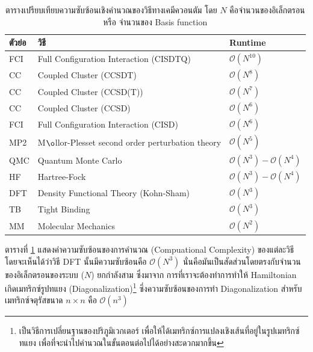 \begin{table}[htbp]
    \centering
    \caption{ตารางเปรียบเทียบความซับซ้อนเชิงคำนวณของวิธีทางเคมีควอนตัม\autocite{rupp2015} โดย $N$ คือจำนวนของอิเล็กตรอนหรือ%
    จำนวนของ Basis function}
    \label{tab:qm_complx}
    \small
    \begin{tabular}{lll}\toprule
    \textbf{ตัวย่อ} &\textbf{วิธี} &\textbf{Runtime} \\\midrule
    FCI &Full Configuration Interaction (CISDTQ) &$\mathcal{O}(N^{10})$ \\
    CC &Coupled Cluster (CCSDT) &$\mathcal{O}(N^{8})$ \\
    CC &Coupled Cluster (CCSD(T)) &$\mathcal{O}(N^{7})$ \\
    CC &Coupled Cluster (CCSD) &$\mathcal{O}(N^{6})$ \\
    FCI &Full Configuration Interaction (CISD) &$\mathcal{O}(N^{6})$ \\
    MP2 &M$\o$llor-Plesset second order perturbation theory &$\mathcal{O}(N^{5})$ \\
    QMC &Quantum Monte Carlo &$\mathcal{O}(N^{3}) - \mathcal{O}(N^{4})$ \\
    HF &Hartree-Fock &$\mathcal{O}(N^{3}) - \mathcal{O}(N^{4})$ \\
    DFT &Density Functional Theory (Kohn-Sham) &$\mathcal{O}(N^{3})$ \\
    TB &Tight Binding &$\mathcal{O}(N^{3})$ \\
    MM &Molecular Mechanics &$\mathcal{O}(N^{2})$ \\
    \bottomrule
    \end{tabular}
\end{table}

ตารางที่ \ref{tab:qm_complx} แสดงค่าความซับซ้อนของการคำนวณ (Compuational Complexity) ของแต่ละวิธี โดยจะเห็นได้ว่าวิธี DFT 
นั้นมีความซับซ้อนคือ $\mathcal{O}(N^{3})$ นั่นคือมันเป็นสัดส่วนโดยตรงกับจำนวนของอิเล็กตรอนของระบบ ($N$) ยกกำลังสาม ซึ่งมาจาก%
การที่เราจะต้องทำการทำให้ Hamiltonian เกิดเมทริกซ์รูปทแยง (Diagonalization)\footnote{เป็นวิธีการเปลี่ยนฐานของปริภูมิเวกเตอร์%
เพื่อให้ได้เมทริกซ์การแปลงเชิงเส้นที่อยู่ในรูปเมทริกซ์ทแยง เพื่อที่จะนำไปคำนวณในขั้นตอนต่อไปได้อย่างสะดวกมากขึ้น} ซึ่งความซับซ้อนของการทำ 
Diagonalization สำหรับเมทริกซ์จตุรัสขนาด $n \times n$ คือ 
$\mathcal{O}(n^{3})$

